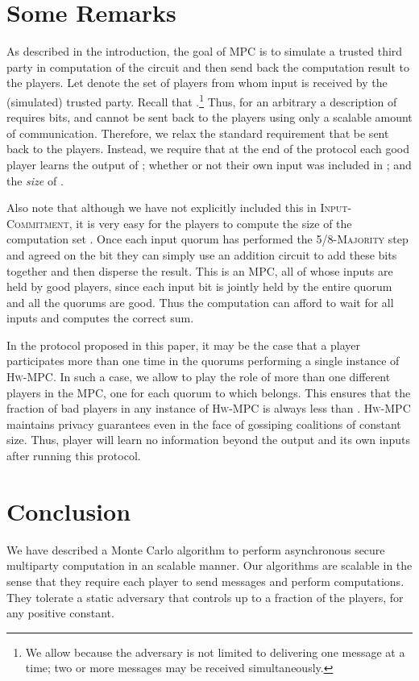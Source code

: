 \documentclass[10pt]{llncs}
\newcommand{\thresh}{5/8\xspace}
\newcommand{\hw}{\textsc{Hw-MPC}\xspace}
\newcommand{\ic}{\textsc{Input-Commitment}\xspace}
\newcommand{\maj}{\thresh-\textsc{Majority}\xspace}
\begin{document}
\section{Some Remarks} 
\label{s:dis}
As described in the introduction, the goal of MPC is to simulate a
trusted third party in computation of the circuit and then send back
the computation result to the players.  Let  denote the set of
players from whom input is received by the (simulated) trusted
party. Recall that .\footnote{We allow  because the adversary is not limited to delivering one message
  at a time; two or more messages may be received simultaneously.}
Thus, for an arbitrary  a description of  requires 
bits, and cannot be sent back to the players using only a scalable
amount of communication. Therefore, we relax the standard requirement
that  be sent back to the players.  Instead, we require that at the
end of the protocol each good player learns the output of ; whether
or not their own input was included in ; and the \emph{size} of
.

Also note that although we have not explicitly included this in \ic,
it is very easy for the players to compute the size of the computation
set . Once each input quorum  has performed the \maj step and
agreed on the bit  they can simply use an 
addition circuit to add these bits together and then
disperse the result. This is an MPC, all
of whose inputs are held by good players, since each input bit 
is jointly held by the entire quorum  and all the quorums are
good. Thus the computation can afford to wait for all  inputs and 
computes the correct sum.

In the protocol proposed in this paper, it may be the case that a
player  participates more than one time in the quorums performing a
single instance of \hw. In such a case, we allow  to play the role
of more than one different players in the MPC, one for each quorum to
which  belongs. This ensures that the fraction of bad players in
any instance of \hw is always less than . \hw maintains privacy
guarantees even in the face of gossiping coalitions of constant
size. Thus, player  will learn no information beyond the output and
its own inputs after running this protocol.

\section{Conclusion} \label{sec:conclusion}

We have described a Monte Carlo algorithm to perform asynchronous
secure multiparty computation in an scalable manner.  Our algorithms
are scalable in the sense that they require each player to send
 messages and perform
 computations.  They tolerate a
static adversary that controls up to a  fraction of
the players, for  any positive constant.
\end{document}
